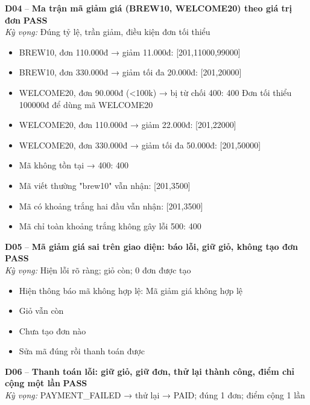 \documentclass[a4paper,11pt]{article}
\newcommand{\ok}{\textcolor{okgreen}{\textbf{PASS}}}
\begin{document}
\begin{minipage}{\textwidth}\vspace{4pt}\textbf{\textcolor{brew}{D04}} -- \textbf{Ma trận mã giảm giá (BREW10, WELCOME20) theo giá trị đơn} \hfill \ok\\
{\small\emph{Kỳ vọng:} Đúng tỷ lệ, trần giảm, điều kiện đơn tối thiểu}
\end{minipage}
\begin{itemize}\footnotesize
\item \tick BREW10, đơn 110.000đ → giảm 11.000đ: [201,11000,99000]
\item \tick BREW10, đơn 330.000đ → giảm tối đa 20.000đ: [201,20000]
\item \tick WELCOME20, đơn 90.000đ (\textless{}100k) → bị từ chối 400: 400 Đơn tối thiểu 100000đ để dùng mã WELCOME20
\item \tick WELCOME20, đơn 110.000đ → giảm 22.000đ: [201,22000]
\item \tick WELCOME20, đơn 330.000đ → giảm tối đa 50.000đ: [201,50000]
\item \tick Mã không tồn tại → 400: 400
\item \tick Mã viết thường "brew10" vẫn nhận: [201,3500]
\item \tick Mã có khoảng trắng hai đầu vẫn nhận: [201,3500]
\item \tick Mã chỉ toàn khoảng trắng không gây lỗi 500: 400
\end{itemize}
\begin{minipage}{\textwidth}\vspace{4pt}\textbf{\textcolor{brew}{D05}} -- \textbf{Mã giảm giá sai trên giao diện: báo lỗi, giữ giỏ, không tạo đơn} \hfill \ok\\
{\small\emph{Kỳ vọng:} Hiện lỗi rõ ràng; giỏ còn; 0 đơn được tạo}
\end{minipage}
\begin{itemize}\footnotesize
\item \tick Hiện thông báo mã không hợp lệ: Mã giảm giá không hợp lệ
\item \tick Giỏ vẫn còn
\item \tick Chưa tạo đơn nào
\item \tick Sửa mã đúng rồi thanh toán được
\end{itemize}
\begin{minipage}{\textwidth}\vspace{4pt}\textbf{\textcolor{brew}{D06}} -- \textbf{Thanh toán lỗi: giữ giỏ, giữ đơn, thử lại thành công, điểm chỉ cộng một lần} \hfill \ok\\
{\small\emph{Kỳ vọng:} PAYMENT\_FAILED → thử lại → PAID; đúng 1 đơn; điểm cộng 1 lần}
\end{minipage}
\end{document}
